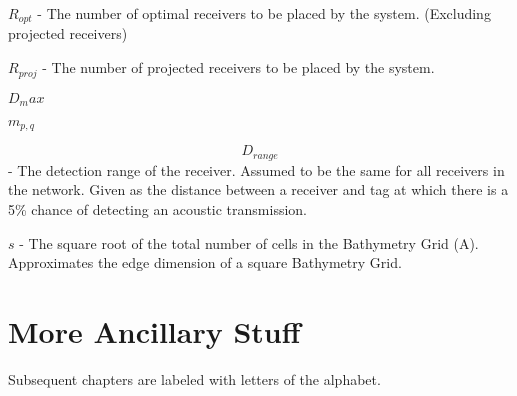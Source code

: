 $R_{opt}$ - The number of optimal receivers to be placed by the system. (Excluding projected receivers)

$R_{proj}$ - The number of projected receivers to be placed by the system.

$D_max$

$m_{p,q}$

$$D_{range}$$ - The detection range of the receiver.  Assumed to be the same for all receivers in the network.  Given as the distance between a receiver and tag at which there is a 5\% chance of detecting an acoustic transmission.

$s$ - The square root of the total number of cells in the Bathymetry Grid (A).  Approximates the edge dimension of a square Bathymetry Grid.


\chapter{More Ancillary Stuff}

Subsequent chapters are labeled with letters of the alphabet.

